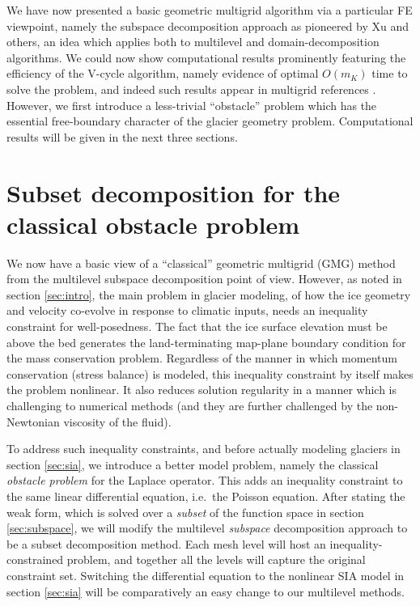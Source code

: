 \documentclass[letterpaper,final,12pt,reqno]{amsart}
\begin{document}
We have now presented a basic geometric multigrid algorithm via a particular FE viewpoint, namely the subspace decomposition approach as pioneered by Xu \cite{Xu1992} and others, an idea which applies both to multilevel and domain-decomposition algorithms.  We could now show computational results prominently featuring the efficiency of the V-cycle algorithm, namely evidence of optimal $O(m_K)$ time to solve the problem, and indeed such results appear in multigrid references \cite{Briggsetal2000,Bueler2021,Elmanetal2014,Trottenbergetal2001}.  However, we first introduce a less-trivial ``obstacle'' problem which has the essential free-boundary character of the glacier geometry problem.  Computational results will be given in the next three sections.


\section{Subset decomposition for the classical obstacle problem} \label{sec:obstacle}

We now have a basic view of a ``classical'' geometric multigrid (GMG) method from the multilevel subspace decomposition point of view.  However, as noted in section \ref{sec:intro}, the main problem in glacier modeling, of how the ice geometry and velocity co-evolve in response to climatic inputs, needs an inequality constraint for well-posedness.  The fact that the ice surface elevation must be above the bed generates the land-terminating map-plane boundary condition for the mass conservation problem.  Regardless of the manner in which momentum conservation (stress balance) is modeled, this inequality constraint by itself makes the problem nonlinear.  It also reduces solution regularity in a manner which is challenging to numerical methods (and they are further challenged by the non-Newtonian viscosity of the fluid).

To address such inequality constraints, and before actually modeling glaciers in section \ref{sec:sia}, we introduce a better model problem, namely the classical \emph{obstacle problem} for the Laplace operator.  This adds an inequality constraint to the same linear differential equation, i.e.~the Poisson equation.  After stating the weak form, which is solved over a \emph{subset} of the function space in section \ref{sec:subspace}, we will modify the multilevel \emph{subspace} decomposition approach to be a subset decomposition method.  Each mesh level will host an inequality-constrained problem, and together all the levels will capture the original constraint set.  Switching the differential equation to the nonlinear SIA model in section \ref{sec:sia} will be comparatively an easy change to our multilevel methods.
\end{document}
